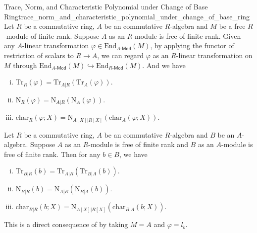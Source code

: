 \begin{proposition}{Trace, Norm, and Characteristic Polynomial under Change of Base Ring}{trace_norm_and_characteristic_polynomial_under_change_of_base_ring}
    Let $R$ be a commutative ring, $A$ be an commutative $R$-algebra and $M$ be a free $R$-module of finite rank. Suppose $A$ as an $R$-module is free of finite rank. Given any $A$-linear transformation $\varphi\in\mathrm{End}_{A\text{-}\mathsf{Mod}}(M)$, by applying the functor of restriction of scalars to $R\to A$, we can regard $\varphi$ as an $R$-linear transformation on $M$ through $\mathrm{End}_{A\text{-}\mathsf{Mod}}(M)\hookrightarrow\mathrm{End}_{R\text{-}\mathsf{Mod}}(M)$. And we have
    \begin{enumerate}[(i)]
        \item $\mathrm{Tr}_{R}(\varphi)=\mathrm{Tr}_{A|R}(\mathrm{Tr}_{A}(\varphi))$.
        \item $\mathrm{N}_{R}(\varphi)=\mathrm{N}_{A|R}(\mathrm{N}_{A}(\varphi))$.
        \item $\mathrm{char}_{R}(\varphi;X)=\mathrm{N}_{A[X]|R[X]}(\mathrm{char}_{A}(\varphi;X))$.
    \end{enumerate}
\end{proposition}
\begin{corollary}{}{}
    Let $R$ be a commutative ring, $A$ be an commutative $R$-algebra and $B$ be an $A$-algebra. Suppose $A$ as an $R$-module is free of finite rank and $B$ as an $A$-module is free of finite rank. Then for any $b\in B$, we have
    \begin{enumerate}[(i)]
        \item $\mathrm{Tr}_{B|R}(b)=\mathrm{Tr}_{A|R}(\mathrm{Tr}_{B|A}(b))$.
        \item $\mathrm{N}_{B|R}(b)=\mathrm{N}_{A|R}(\mathrm{N}_{B|A}(b))$.
        \item $\mathrm{char}_{B|R}(b;X)=\mathrm{N}_{A[X]|R[X]}(\mathrm{char}_{B|A}(b;X))$.
    \end{enumerate}
    
\end{corollary}
\begin{prf}
    This is a direct consequence of  by taking $M=A$ and $\varphi=l_b$.
\end{prf}

